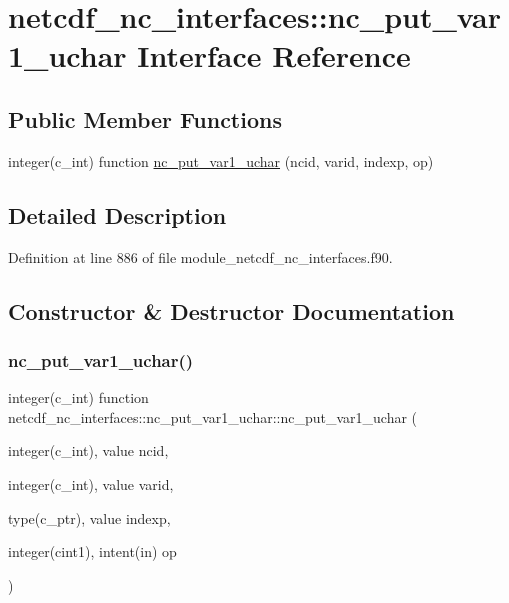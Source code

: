 \hypertarget{interfacenetcdf__nc__interfaces_1_1nc__put__var1__uchar}{}\section{netcdf\+\_\+nc\+\_\+interfaces\+:\+:nc\+\_\+put\+\_\+var1\+\_\+uchar Interface Reference}
\label{interfacenetcdf__nc__interfaces_1_1nc__put__var1__uchar}
\subsection*{Public Member Functions}
\begin{DoxyCompactItemize}
\item 
integer(c\+\_\+int) function \hyperlink{interfacenetcdf__nc__interfaces_1_1nc__put__var1__uchar_ad9760c439e3055eb3e3f35024f3e21e2}{nc\+\_\+put\+\_\+var1\+\_\+uchar} (ncid, varid, indexp, op)
\end{DoxyCompactItemize}


\subsection{Detailed Description}


Definition at line 886 of file module\+\_\+netcdf\+\_\+nc\+\_\+interfaces.\+f90.



\subsection{Constructor \& Destructor Documentation}
\mbox{\label{interfacenetcdf__nc__interfaces_1_1nc__put__var1__uchar_ad9760c439e3055eb3e3f35024f3e21e2}} 
\subsubsection{\texorpdfstring{nc\+\_\+put\+\_\+var1\+\_\+uchar()}{nc\_put\_var1\_uchar()}}
{\footnotesize\ttfamily integer(c\+\_\+int) function netcdf\+\_\+nc\+\_\+interfaces\+::nc\+\_\+put\+\_\+var1\+\_\+uchar\+::nc\+\_\+put\+\_\+var1\+\_\+uchar (\begin{DoxyParamCaption}\item[{integer(c\+\_\+int), value}]{ncid,  }\item[{integer(c\+\_\+int), value}]{varid,  }\item[{type(c\+\_\+ptr), value}]{indexp,  }\item[{integer(cint1), intent(in)}]{op }\end{DoxyParamCaption})}



